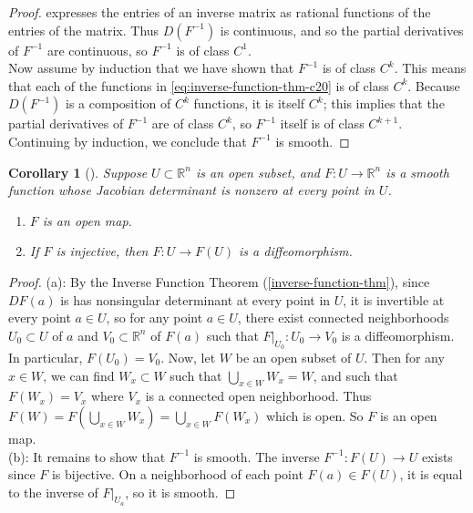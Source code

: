\documentclass[reqno]{amsart}
\theoremstyle{plain}%
\newtheorem{corollary}[theorem]{Corollary}
\theoremstyle{definition}
\theoremstyle{remark}
\begin{document}
\begin{proof}
         expresses the entries of an inverse matrix as rational functions of the
         entries of the matrix. Thus $D\left( F^{-1} \right) $ is continuous, and
         so
         the partial derivatives of $F^{-1}$ are continuous, so
         $F^{-1}$ is of class $C^{1}$.\\
         Now assume by induction that we have shown that
         $F^{-1}$ is of class $C^{k}$. This means that each of the functions in
         \eqref{eq:inverse-function-thm-c20} is of class  $C^{k}$.
         Because $D\left( F^{-1} \right) $ is a composition of
         $C^{k}$ functions, it is itself $C^{k}$; this implies that the partial
         derivatives of $F^{-1}$ are of class $C^{k}$, so
         $F^{-1}$ itself is of class $C^{k+1}$. Continuing by induction, we
         conclude that $F^{-1}$ is smooth.
        \end{proof}

        \begin{corollary}[]\label{corollary-inverse-function-thm}
        Suppose $U \subset \mathbb{R}^{n}$ is an open subset, and
        $F  \colon U \to \mathbb{R}^{n}$ is a smooth function whose Jacobian
        determinant is nonzero at every point in $U$.
        \begin{enumerate}
            \item $F$ is an open map.
            \item If $F$ is injective, then $F  \colon U \to F(U)$ is
                a diffeomorphism.
        \end{enumerate}
        \end{corollary}

        \begin{proof}
        (a): By the Inverse Function Theorem (\ref{inverse-function-thm}), 
        since $DF(a)$ is has nonsingular determinant at every point in $U$, it is
        invertible at every point $a \in U$, so for any point $a \in U$, there
        exist connected neighborhoods $U_0 \subset U$ of $a$ and
        $V_0 \subset \mathbb{R}^{n}$ of $F(a)$ such that
        $F|_{U_0}  \colon U_0 \to V_0$ is a diffeomorphism.
        In particular, $F\left( U_0 \right) = V_0$. Now,
        let $W$ be an open subset of $U$. Then for any
        $x \in W$, we can find $W_x \subset W$ such that
        $\bigcup_{x \in W} W_x = W$, and such that
        $F(W_x) = V_x$ where $V_x$ is a connected open neighborhood.
        Thus  $F(W) = F\left( \bigcup_{x \in W} W_x \right) 
        = \bigcup_{x \in W} F(W_x)$ which is open. So $F$ is an open map.\\
        \linebreak
        (b): It remains to show that $F^{-1}$ is smooth. The inverse
        $F ^{-1}  \colon F(U) \to U$ exists since $F$ is bijective. On
        a neighborhood of each point $F(a) \in F(U)$, it is equal to the inverse of
        $F|_{U_a}$, so it is smooth.
        \end{proof}
\end{document}
